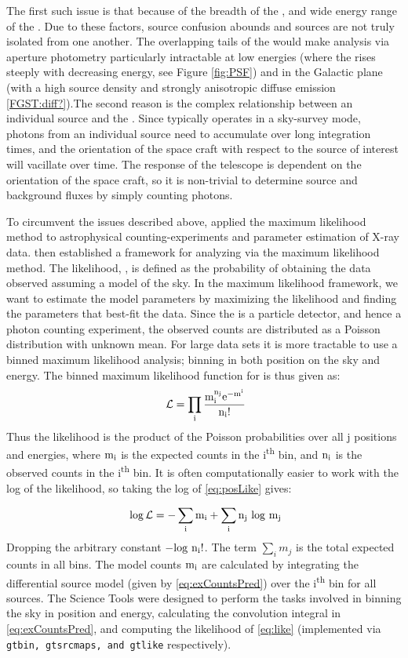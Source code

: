 The first such issue is that because of the breadth of the \lat{} \psf{}, and wide energy range of the \lat{}. Due to these factors, source confusion abounds and sources are not truly isolated from one another. The overlapping tails of the \psf{} would make analysis via aperture photometry particularly intractable at low energies (where the \psf{} rises steeply with decreasing energy, see Figure \ref{fig:PSF}) and in the Galactic plane (with a high source density and strongly anisotropic diffuse emission \ref{FGST:diff?}).The second reason is the complex relationship between an individual source and the \irf{}. Since \Fermi{} typically operates in a sky-survey mode, photons from an individual source need to accumulate over long integration times, and the orientation of the space craft with respect to the source of interest will vacillate over time. The response of the telescope is dependent on the orientation of the space craft, so it is non-trivial to determine source and background fluxes by simply counting photons.

To circumvent the issues described above, \cite{Cash79} applied the maximum likelihood method to astrophysical counting-experiments and parameter estimation of X-ray data. \cite{mattox96} then established a framework for analyzing \egret{} \gam{} via the maximum likelihood method. The likelihood, \like{}, is defined as the probability of obtaining the data observed assuming a model of the sky. In the maximum likelihood framework, we want to estimate the model parameters by maximizing the likelihood and finding the  parameters that best-fit the data. Since the \lat{} is a particle detector, and hence a photon counting experiment, the observed counts are distributed as a Poisson distribution with unknown mean. For large data sets it is more tractable to use a binned maximum likelihood analysis; binning in both position on the sky and energy. The binned maximum likelihood function for \lat{} is thus given as:
\begin{equation}\label{eq:posLike}
{\rm \like{} = \prod_{i} \frac{m_i^{n_j}e^{-m^i}}{n_i!}}
\end{equation}
Thus the likelihood is the product of the Poisson probabilities over all j positions and energies, where ${\rm m_i}$ is the expected counts in the i\textsuperscript{th} bin, and ${\rm n_i}$ is the observed counts in the i\textsuperscript{th} bin.  It is often computationally easier to work with the log of the likelihood, so taking the log of \ref{eq:posLike} gives:

\begin{equation}\label{eq:like}
{\rm \logL{} = -\sum_{i} m_i + \sum_{i} n_j~log~m_j}
\end{equation}
Dropping the arbitrary constant  ${\rm -log~n_i!}$. The term $\sum_{i} m_j $ is the total expected counts in all bins. The model counts ${\rm m_i}$ are calculated by integrating the differential source model (given by \ref{eq:exCountsPred}) over the i\textsuperscript{th} bin for all sources. The \Fermi{} Science Tools were designed to perform the tasks involved in binning the sky in position and energy, calculating the convolution integral in \ref{eq:exCountsPred}, and computing the likelihood of \ref{eq:like} (implemented via {\tt gtbin, gtsrcmaps, and gtlike} respectively).

